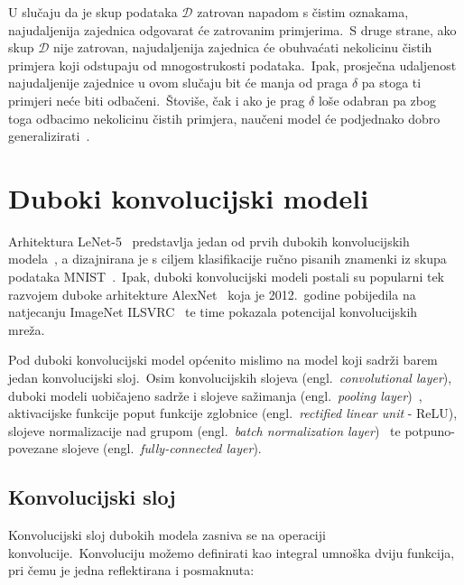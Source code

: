 \documentclass[diplomskirad]{fer}
\begin{document}
\pagebreak

U slučaju da je skup podataka $\mathcal{D}$ zatrovan napadom s čistim oznakama, najudaljenija zajednica odgovarat će zatrovanim primjerima.\ 
S druge strane, ako skup $\mathcal{D}$ nije zatrovan, najudaljenija zajednica će obuhvaćati nekolicinu čistih primjera koji odstupaju od mnogostrukosti podataka.\ 
Ipak, prosječna udaljenost najudaljenije zajednice u ovom slučaju bit će manja od praga $\delta$ pa stoga ti primjeri neće biti odbačeni.\ 
Štoviše, čak i ako je prag $\delta$ loše odabran pa zbog toga odbacimo nekolicinu čistih primjera, naučeni model će podjednako dobro generalizirati~\cite{sabolic2025seal}.\

\chapter{Duboki konvolucijski modeli}
\label{pog:cnn}

Arhitektura LeNet-5~\cite{lecun1989generalization} predstavlja jedan od prvih dubokih konvolucijskih modela~\cite{li2021survey}, a dizajnirana je s ciljem klasifikacije ručno pisanih znamenki iz skupa podataka MNIST~\cite{deng2012mnist}.\ 
Ipak, duboki konvolucijski modeli postali su popularni tek razvojem duboke arhitekture AlexNet~\cite{krizhevsky2012imagenet} koja je 2012.\ godine pobijedila na natjecanju ImageNet ILSVRC~\cite{russakovsky2015imagenet} te time pokazala potencijal konvolucijskih mreža.\ 

Pod duboki konvolucijski model općenito mislimo na model koji sadrži barem jedan konvolucijski sloj.\ 
Osim konvolucijskih slojeva (engl.\ \textit{convolutional layer}), duboki modeli uobičajeno sadrže i slojeve sažimanja (engl.\ \textit{pooling layer})~\cite{boureau2010theoretical}, aktivacijske funkcije poput funkcije zglobnice (engl.\ \textit{rectified linear unit} - ReLU), slojeve normalizacije nad grupom (engl.\ \textit{batch normalization layer})~\cite{ioffe2015batch} te potpuno-povezane slojeve (engl.\ \textit{fully-connected layer}).\ 

\section{Konvolucijski sloj}
\label{sek:conv}

Konvolucijski sloj dubokih modela zasniva se na operaciji konvolucije.\ Konvoluciju možemo definirati kao integral umnoška dviju funkcija, pri čemu je jedna reflektirana i posmaknuta:
\end{document}
